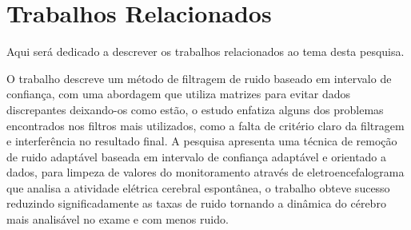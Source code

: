 

\chapter{Trabalhos Relacionados}\label{referencial_teorico}
Aqui será dedicado a descrever os trabalhos relacionados ao tema desta pesquisa.

O trabalho \cite{kalambet2011noise} descreve um método de filtragem de ruido baseado em intervalo de confiança, com uma abordagem que utiliza matrizes para evitar dados discrepantes deixando-os como estão, o estudo enfatiza alguns dos problemas encontrados nos filtros mais utilizados, como a falta de critério claro da filtragem e interferência no resultado final. A pesquisa \cite{madhale2020adaptive} apresenta uma técnica de remoção de ruido adaptável baseada em intervalo de confiança adaptável e orientado a dados, para limpeza de valores do monitoramento através de eletroencefalograma que analisa a atividade elétrica cerebral espontânea, o trabalho obteve sucesso reduzindo significadamente as taxas de ruido tornando a dinâmica do cérebro mais analisável no exame e com menos ruido.





